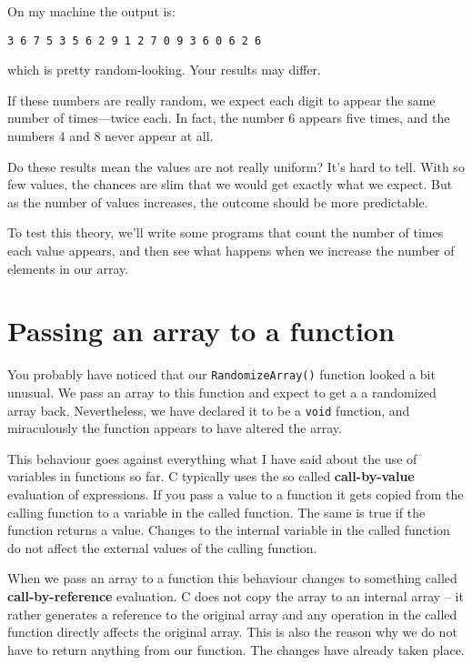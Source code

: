 %
On my machine the output is:

\begin{verbatim}
3 6 7 5 3 5 6 2 9 1 2 7 0 9 3 6 0 6 2 6 
\end{verbatim}
\nopagebreak%
which is pretty random-looking.  Your results may differ.

If these numbers are really random,
we expect each digit to appear the same number of times---twice
each.  In fact, the number 6 appears five times, and the numbers 4
and 8 never appear at all.

Do these results mean the values are not really uniform?  It's
hard to tell.  With so few values, the chances are slim
that we would get exactly what we expect.  But as the number
of values increases, the outcome should be more predictable.

To test this theory, we'll write some programs that count the
number of times each value appears, and then see what happens
when we increase the number of elements in our array.

\section{Passing an array to a function}
\label{Passing an array to a function}
You probably have noticed that our {\tt RandomizeArray()} function 
looked a bit unusual. We pass an array to this function and expect 
to get a a randomized array back. Nevertheless, we have declared it to 
be a {\tt void} function, and miraculously the function appears to have 
altered the array.

This behaviour goes against everything what I have said about the
use of variables in functions so far.
C typically uses the so called {\bf call-by-value} evaluation of
expressions. If you pass a value to a function it gets copied from
the calling function to a variable in the called function. The same
is true if the function returns a value.
Changes to the internal variable in the called function do not affect the external 
values of the calling function.

When we pass an array to a function this behaviour changes to
something called {\bf call-by-reference} evaluation.
C does not copy the array to an internal array --  it rather generates a
reference to the original array and any operation in the called function 
directly affects the original array.
This is also the reason why we do not have to return anything from our 
function. The changes have already taken place. 

